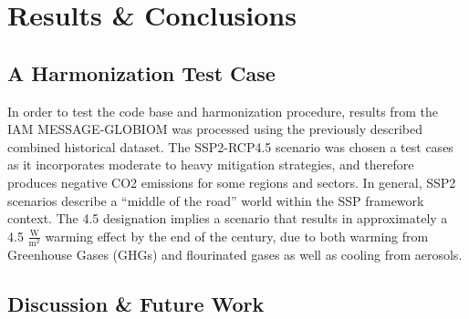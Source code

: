\section{Results \& Conclusions}

\subsection{A Harmonization Test Case}

In order to test the  code base and harmonization procedure,
results from the IAM MESSAGE-GLOBIOM  was processed using the
previously described combined historical dataset. The SSP2-RCP4.5 scenario was
chosen a test cases as it incorporates moderate to heavy mitigation strategies,
and therefore produces negative CO2 emissions for some regions and sectors. In
general, SSP2 scenarios describe a ``middle of the road'' world within the SSP
framework context. The 4.5 designation implies a scenario that results in
approximately a 4.5 $\frac{\text{W}}{\text{m}^2}$ warming effect by the end of
the century, due to both warming from Greenhouse Gases (GHGs) and flourinated
gases as well as cooling from aerosols.


\subsection{Discussion \& Future Work}


